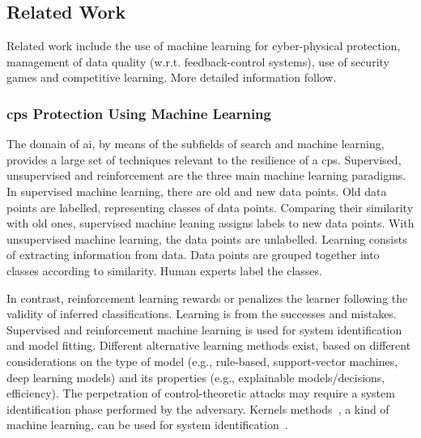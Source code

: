 \documentclass[letterpaper, 10pt, conference]{IEEEtran}
\begin{document}
\subsection{Related Work}

Related work include the use of machine 
learning for cyber-physical protection, management of
data quality (w.r.t. feedback-control systems), use of security 
games and competitive learning. More detailed information 
follow.

\medskip

\subsubsection{\gls*{cps} Protection Using Machine 
Learning} 

The domain of \gls*{ai}, by means of the 
subfields of search and machine learning, provides a large set of 
techniques relevant to the resilience of a \gls*{cps}.  Supervised, unsupervised and
reinforcement
are the three main machine
learning paradigms. In supervised machine learning, there are old and new
data points. Old data points are labelled, representing
classes of data points. Comparing their similarity with old
ones, supervised machine leaning assigns labels to
new data points. With unsupervised machine learning, the data points
are unlabelled. Learning  consists of extracting information from
data. Data points are grouped together into classes according to
similarity. Human experts label the classes. 

In contrast, reinforcement learning rewards or penalizes the learner
following the validity of inferred classifications. Learning is  from the successes 
and mistakes. Supervised and reinforcement machine learning is
used for system identification and model fitting. 
Different alternative learning
methods exist, based on different considerations on the type of model
(e.g., rule-based, support-vector machines, deep learning models) and
its properties (e.g., explainable models/decisions, efficiency). The
perpetration of control-theoretic attacks 
\cite{Teixeira2015,smith2015covert} may require a
system identification phase performed by the adversary. Kernels
methods~\cite{shawe2004kernel}, a kind of machine learning, can be used for system identification~\cite{PILLONETTO2014657,PILLONETTO201081}.

\end{document}
